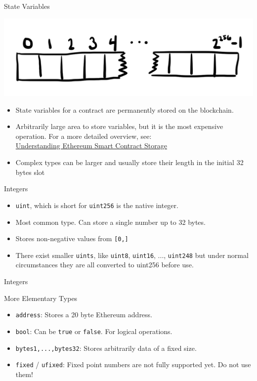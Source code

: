 \documentclass[]{beamer}
\begin{document}
\begin{frame}{State Variables}
\begin{center}
\includegraphics[scale=0.2]{../assets/images/sc_storage}
\end{center}


	\begin{itemize}
		\item State variables for a contract are permanently stored on the blockchain.
		\item Arbitrarily large area to store variables, but it is the most expensive operation. For a more detailed overview, see: \\ \link \href{https://programtheblockchain.com/posts/2018/03/09/understanding-ethereum-smart-contract-storage/}{Understanding Ethereum Smart Contract Storage}
		\item Complex types can be larger and usually store their length in the initial 32 bytes slot
	\end{itemize}
\end{frame}

\begin{frame}{Integers}
\begin{itemize}
\item<1->{\texttt{uint}, which is short for \texttt{uint256} is the native integer.}
\item<1->{Most common type. Can store a single number up to 32 bytes.}
\item<1->{Stores non-negative values from \texttt{[0,]}}
\item<1->{There exist smaller \texttt{uints}, like \texttt{uint8}, \texttt{uint16}, ..., \texttt{uint248} but under normal circumstances they are all converted to uint256 before use.}
\end{itemize}
	\begin{samplecode}{Integers}
		
	\end{samplecode}
\end{frame}

\begin{frame}{More Elementary Types}
	\begin{itemize}
		\item \texttt{address}: Stores a 20 byte Ethereum address.
		\item \texttt{bool}: Can be \texttt{true} or \texttt{false}. For logical operations.
		\item \texttt{bytes1,...,bytes32}: Stores arbitrarily data of a fixed size.
		\item \texttt{fixed} / \texttt{ufixed}: Fixed point numbers are not fully supported yet. Do not use them!
	\end{itemize}
\end{frame}
\end{document}
